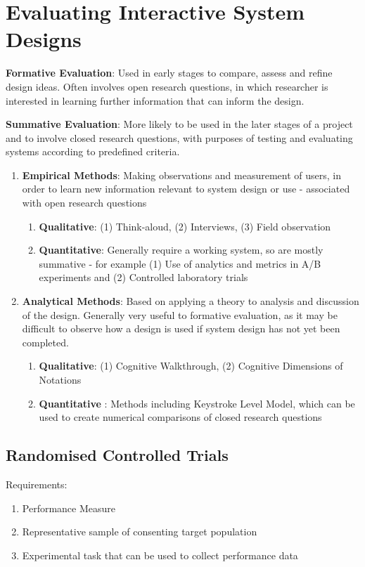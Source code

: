 \documentclass{article}
\newenvironment{definition}{\par\color{blue}}{\par}
\begin{document}
\section{Evaluating Interactive System Designs}
\begin{definition}
\textbf{Formative Evaluation}: Used in early stages to compare, assess and refine design ideas. Often involves open research questions, in which researcher is interested in learning further information that can inform the design.

\bigskip
\noindent
\textbf{Summative Evaluation}: More likely to be used in the later stages of a project and to involve closed research questions, with purposes of testing and evaluating systems according to predefined criteria.

\bigskip
\noindent

\begin{enumerate}
    \item \textbf{Empirical Methods}: Making observations and measurement of users, in order to learn new information relevant to system design or use - associated with open research questions
    \begin{enumerate}
        \item \textbf{Qualitative}: (1) Think-aloud, (2) Interviews, (3) Field observation
        \item \textbf{Quantitative}: Generally require a working system, so are mostly summative - for example (1) Use of analytics and metrics in A/B experiments and (2) Controlled laboratory trials
    \end{enumerate}
    \item \textbf{Analytical Methods}: Based on applying a theory to analysis and discussion of the design. Generally very useful to formative evaluation, as it may be difficult to observe how a design is used if system design has not yet been completed. 
    \begin{enumerate}
        \item \textbf{Qualitative}: (1) Cognitive Walkthrough, (2) Cognitive Dimensions of Notations
        \item \textbf{Quantitative }: Methods including Keystroke Level Model, which can be used to create numerical comparisons of closed research questions
    \end{enumerate}
\end{enumerate}
\end{definition}

\subsection{Randomised Controlled Trials}
Requirements:
\begin{enumerate}
    \item Performance Measure
    \item Representative sample of consenting target population
    \item Experimental task that can be used to collect performance data
\end{enumerate}
\end{document}
